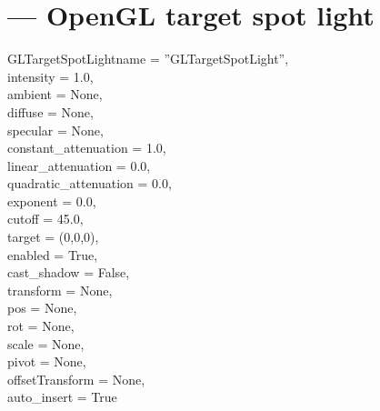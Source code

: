 
\section{ ---
         OpenGL target spot light}

\begin{classdesc}{GLTargetSpotLight}{name = ''GLTargetSpotLight'',\\ 
                       intensity = 1.0,\\
                       ambient = None,\\
                       diffuse = None,\\
                       specular = None,\\
                       constant_attenuation = 1.0,\\
                       linear_attenuation = 0.0,\\
                       quadratic_attenuation = 0.0,\\
                       exponent = 0.0,\\
                       cutoff = 45.0,\\
                       target = (0,0,0),\\
                       enabled = True,\\
                       cast_shadow = False,\\
                       transform = None,\\
                       pos = None,\\
                       rot = None,\\
                       scale = None,\\
                       pivot = None,\\
                       offsetTransform = None,\\
                       auto_insert = True}

\end{classdesc}


